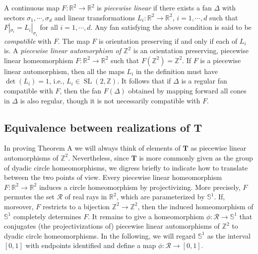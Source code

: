 \documentclass[11pt]{amsart}
\theoremstyle{definition}
\theoremstyle{plain}
\theoremstyle{remark}
\numberwithin{equation}{section}
\newcommand{\origin}{\mathbf{0}}
\DeclareMathOperator{\SL}{SL}
\def\R{\mathbb{R}}
\def\Z{\mathbb{Z}}
\def\S{\mathbb{S}}
\def\TT{\mathbf{T}}
\def\RR{{\mathcal{R}}}
\def\fan{\Delta}
\begin{document}


A continuous map $F:\R^2\to\R^2$ is {\em piecewise linear} if there exists a fan $\fan$ with sectors $\sigma_1,\cdots,\sigma_d$ and linear transformations $L_i:\R^2\to\R^2$, $i=1,\cdots,d$ such that $F|_{\sigma_i}=L_i|_{\sigma_i}$ for all $i=1,\cdots,d$.  Any fan satisfying the above condition is said to be {\em compatible} with $F$.
The map $F$ is orientation preserving if and only if each of $L_i$ is.
A {\em piecewise linear automorphism of $\Z^2$} is an orientation preserving,
piecewise linear homeomorphism $F:\R^2\to\R^2$ such that
$F(\Z^2)=\Z^2$. If $F$ is a piecewise linear automorphism, then all the maps $L_i$ in the definition must have $\det(L_i)=1$, i.e., $L_i\in \SL(2,\Z)$.  It follows that if $\Delta$ is a regular fan compatible with $F$, then the fan $F(\Delta)$ obtained by mapping forward all cones in $\Delta$ is also regular, though it is not necessarily compatible with $F$.


%
%


\subsection{Equivalence between realizations of $\TT$}

In proving Theorem A we will always think of elements of $\TT$ as piecewise linear automorphisms of $\Z^2$.  Nevertheless, since $\TT$ is more commonly given as the group of dyadic circle homeomorphisms, we digress briefly to indicate how to translate between the two points of view.  Every piecewise linear homeomorphism $F:\R^2\to\R^2$ induces a circle homeomorphism by projectivizing.  More precisely, $F$ permutes the set $\RR$ of real rays in $\R^2$, which are parameterized by $\S^1$.  If, moreover, $F$ restricts to a bijection $\Z^2\to\Z^2$, then the induced homeomorphism of $\S^1$ completely determines $F$.  It remains to give a homeomorphism $\phi:\RR \to \S^1$ that conjugates (the projectivizations of) piecewise linear automorphisms of $\Z^2$ to dyadic circle homeomorphisms.  In the following, we will regard $\S^1$ as the interval $[0,1]$ with endpoints identified and define a map $\phi:\RR \to [0,1]$. 
\end{document}
